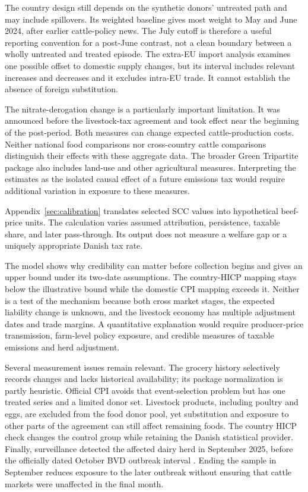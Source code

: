 \documentclass[11pt]{article}
\begin{document}
The country design still depends on the synthetic donors' untreated path and may include spillovers. Its weighted baseline gives most weight to May and June 2024, after earlier cattle-policy news. The July cutoff is therefore a useful reporting convention for a post-June contrast, not a clean boundary between a wholly untreated and treated episode. The extra-EU import analysis examines one possible offset to domestic supply changes, but its interval includes relevant increases and decreases and it excludes intra-EU trade. It cannot establish the absence of foreign substitution.

The nitrate-derogation change is a particularly important limitation. It was announced before the livestock-tax agreement and took effect near the beginning of the post-period. Both measures can change expected cattle-production costs. Neither national food comparisons nor cross-country cattle comparisons distinguish their effects with these aggregate data. The broader Green Tripartite package also includes land-use and other agricultural measures. Interpreting the estimates as the isolated causal effect of a future emissions tax would require additional variation in exposure to these measures.

Appendix~\ref{sec:calibration} translates selected SCC values into hypothetical beef-price units. The calculation varies assumed attribution, persistence, taxable share, and later pass-through. Its output does not measure a welfare gap or a uniquely appropriate Danish tax rate.

The model shows why credibility can matter before collection begins and gives an upper bound under its two-date assumptions. The country-HICP mapping stays below the illustrative bound while the domestic CPI mapping exceeds it. Neither is a test of the mechanism because both cross market stages, the expected liability change is unknown, and the livestock economy has multiple adjustment dates and trade margins. A quantitative explanation would require producer-price transmission, farm-level policy exposure, and credible measures of taxable emissions and herd adjustment.

Several measurement issues remain relevant. The grocery history selectively records changes and lacks historical availability; its package normalization is partly heuristic. Official CPI avoids that event-selection problem but has one treated series and a limited donor set. Livestock products, including poultry and eggs, are excluded from the food donor pool, yet substitution and exposure to other parts of the agreement can still affect remaining foods. The country HICP check changes the control group while retaining the Danish statistical provider. Finally, surveillance detected the affected dairy herd in September 2025, before the officially dated October BVD outbreak interval \citep{dvt2025,dvfaBVD}. Ending the sample in September reduces exposure to the later outbreak without ensuring that cattle markets were unaffected in the final month.
\end{document}

